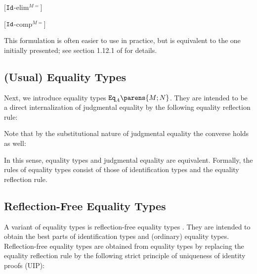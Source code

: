 \documentclass[11pt]{article}
\begin{document}
\begin{prooftree*}
	[$\idtype$-elim$^{M=}$]{}
\end{prooftree*}
\begin{prooftree*}
	[$\idtype$-comp$^{M=}$]{}
\end{prooftree*}

This formulation is often easier to use in practice, but is equivalent to the one initially presented; see section 1.12.1 of \cite{hott-as:book} for details.

\subsection{(Usual) Equality Types}

Next, we introduce equality types $\mathtt{Eq}_A\parens{M; N}$. They are intended to be a direct internalization of judgmental equality by the following equality reflection rule:

\begin{prooftree*}
\end{prooftree*}

Note that by the substitutional nature of judgmental equality the converse holds as well:

\begin{prooftree*}
\end{prooftree*}

In this sense, equality types and judgmental equality are equivalent. Formally, the rules of equality types consist of those of identification types and the equality reflection rule.

\subsection{Reflection-Free Equality Types}
A variant of equality types is reflection-free equality types \cite{sterling_et_al:LIPIcs:2019:10538}. They are intended to obtain the best parts of identification types and (ordinary) equality types. Reflection-free equality types are obtained from equality types by replacing the equality reflection rule by the following strict principle of uniqueness of identity proofs (UIP):
\end{document}
